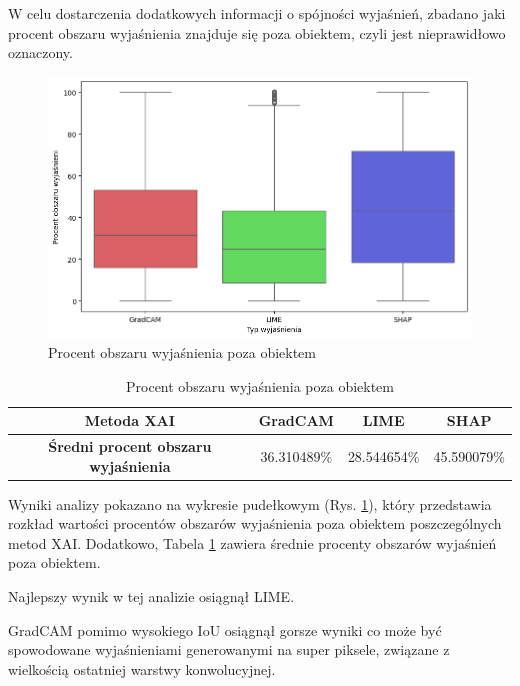 \vspace{1cm}

W celu dostarczenia dodatkowych informacji o spójności wyjaśnień, zbadano jaki procent obszaru wyjaśnienia znajduje się poza obiektem, czyli jest nieprawidłowo oznaczony.

\begin{figure}[h]
	\centering\includegraphics[width=.9\textwidth]{img/areaincorrect}
	\caption{Procent obszaru wyjaśnienia poza obiektem}  \label{rys:areaincorrect}
\end{figure}

\begin{table}[h]
	\centering
	\begin{tabular}{|c|c|c|c|}
		\hline
		\textbf{Metoda XAI}                          & \textbf{GradCAM} & \textbf{LIME} & \textbf{SHAP} \\
		\hline
		\textbf{Średni procent obszaru wyjaśnienia } & 36.310489\%      & 28.544654\%   & 45.590079\%   \\
		\hline
	\end{tabular}
	\caption{Procent obszaru wyjaśnienia poza obiektem}
	\label{tab:areaincorrect}
\end{table}

Wyniki analizy pokazano na wykresie pudełkowym (Rys. \ref{rys:areaincorrect}), który przedstawia rozkład wartości procentów obszarów wyjaśnienia poza obiektem poszczególnych metod XAI.
Dodatkowo, Tabela \ref{tab:areaincorrect} zawiera średnie procenty obszarów wyjaśnień poza obiektem.

Najlepszy wynik w tej analizie osiągnął LIME.

GradCAM pomimo wysokiego IoU osiągnął gorsze wyniki co może być spowodowane wyjaśnieniami generowanymi na super piksele, związane z wielkością ostatniej warstwy konwolucyjnej.

